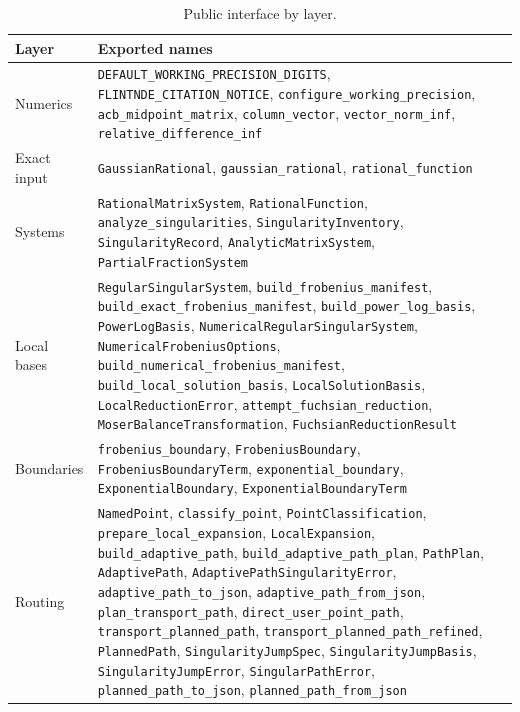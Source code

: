 \documentclass[11pt,a4paper]{article}
\begin{document}
\begin{table}[!ht]
\centering
\footnotesize
\caption{Public interface by layer.}
\label{tab:api}
\begin{tabular}{@{}l>{\raggedright\arraybackslash}p{}@{}}
\toprule
Layer & Exported names\\
\midrule
Numerics & \texttt{DEFAULT\_WORKING\_PRECISION\_DIGITS},
\texttt{FLINTNDE\_CITATION\_NOTICE}, \texttt{configure\_working\_precision},
\texttt{acb\_midpoint\_matrix},
\texttt{column\_vector}, \texttt{vector\_norm\_inf},
\texttt{relative\_difference\_inf}\\
Exact input & \texttt{GaussianRational}, \texttt{gaussian\_rational},
\texttt{rational\_function}\\
Systems & \texttt{RationalMatrixSystem}, \texttt{RationalFunction},
\texttt{analyze\_singularities}, \texttt{SingularityInventory},
\texttt{SingularityRecord}, \texttt{AnalyticMatrixSystem},
\texttt{PartialFractionSystem}\\
Local bases & \texttt{RegularSingularSystem}, \texttt{build\_frobenius\_manifest},
\texttt{build\_exact\_frobenius\_manifest}, \texttt{build\_power\_log\_basis},
\texttt{PowerLogBasis}, \texttt{NumericalRegularSingularSystem},
\texttt{NumericalFrobeniusOptions},
\texttt{build\_numerical\_frobenius\_manifest}, \texttt{build\_local\_solution\_basis},
\texttt{LocalSolutionBasis}, \texttt{LocalReductionError},
\texttt{attempt\_fuchsian\_reduction}, \texttt{MoserBalanceTransformation},
\texttt{FuchsianReductionResult}\\
Boundaries & \texttt{frobenius\_boundary}, \texttt{FrobeniusBoundary},
\texttt{FrobeniusBoundaryTerm}, \texttt{exponential\_boundary},
\texttt{ExponentialBoundary}, \texttt{ExponentialBoundaryTerm}\\
Routing & \texttt{NamedPoint}, \texttt{classify\_point}, \texttt{PointClassification},
\texttt{prepare\_local\_expansion}, \texttt{LocalExpansion},
\texttt{build\_adaptive\_path}, \texttt{build\_adaptive\_path\_plan}, \texttt{PathPlan},
\texttt{AdaptivePath}, \texttt{AdaptivePathSingularityError},
\texttt{adaptive\_path\_to\_json}, \texttt{adaptive\_path\_from\_json},
\texttt{plan\_transport\_path}, \texttt{direct\_user\_point\_path},
\texttt{transport\_planned\_path}, \texttt{transport\_planned\_path\_refined},
\texttt{PlannedPath}, \texttt{SingularityJumpSpec}, \texttt{SingularityJumpBasis},
\texttt{SingularityJumpError}, \texttt{SingularPathError},
\texttt{planned\_path\_to\_json}, \texttt{planned\_path\_from\_json}\\

\end{tabular}
\end{table}
\end{document}
